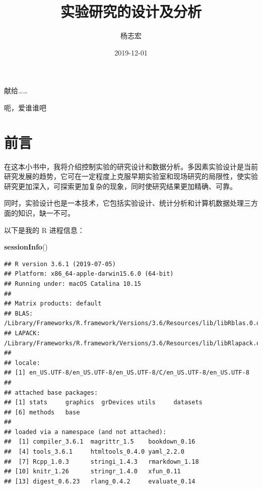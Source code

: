 \documentclass[]{ctexbook}
\title{实验研究的设计及分析}
\author{杨志宏}
\date{2019-12-01}
\newenvironment{Shaded}{\begin{snugshade}}{\end{snugshade}}
\newcommand{\KeywordTok}[1]{\textcolor[rgb]{0.13,0.29,0.53}{\textbf{#1}}}
\newcommand{\NormalTok}[1]{#1}
\begin{document}
\maketitle


\thispagestyle{empty}

\begin{center}
献给……

呃，爱谁谁吧
\end{center}

\setlength{\abovedisplayskip}{-5pt}
\setlength{\abovedisplayshortskip}{-5pt}

{
\setcounter{tocdepth}{2}
\tableofcontents
}
\listoftables
\listoffigures
\hypertarget{ux524dux8a00}{%
\chapter*{前言}\label{ux524dux8a00}}


在这本小书中，我将介绍控制实验的研究设计和数据分析。多因素实验设计是当前研究发展的趋势，它可在一定程度上克服早期实验室和现场研究的局限性，使实验研究更加深入，可探索更加复杂的现象，同时使研究结果更加精确、可靠。

同时，实验设计也是一本技术，它包括实验设计、统计分析和计算机数据处理三方面的知识，缺一不可。

以下是我的 R 进程信息：

\begin{Shaded}
\begin{Highlighting}[]
\KeywordTok{sessionInfo}\NormalTok{()}
\end{Highlighting}
\end{Shaded}

\begin{verbatim}
## R version 3.6.1 (2019-07-05)
## Platform: x86_64-apple-darwin15.6.0 (64-bit)
## Running under: macOS Catalina 10.15
## 
## Matrix products: default
## BLAS:   /Library/Frameworks/R.framework/Versions/3.6/Resources/lib/libRblas.0.dylib
## LAPACK: /Library/Frameworks/R.framework/Versions/3.6/Resources/lib/libRlapack.dylib
## 
## locale:
## [1] en_US.UTF-8/en_US.UTF-8/en_US.UTF-8/C/en_US.UTF-8/en_US.UTF-8
## 
## attached base packages:
## [1] stats     graphics  grDevices utils     datasets 
## [6] methods   base     
## 
## loaded via a namespace (and not attached):
##  [1] compiler_3.6.1  magrittr_1.5    bookdown_0.16  
##  [4] tools_3.6.1     htmltools_0.4.0 yaml_2.2.0     
##  [7] Rcpp_1.0.3      stringi_1.4.3   rmarkdown_1.18 
## [10] knitr_1.26      stringr_1.4.0   xfun_0.11      
## [13] digest_0.6.23   rlang_0.4.2     evaluate_0.14
\end{verbatim}
\end{document}
